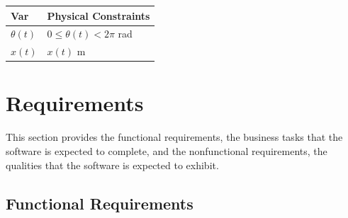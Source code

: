 \documentclass[12pt]{article}
\newcommand{\aref}[1]{A\ref{#1}}
\begin{document}
\begin{table}[!h]
\caption{Output Variables} \label{TblOutputVar}
\renewcommand{\arraystretch}{1.2}
\noindent \begin{longtable*}{l l} 
  \toprule
  \textbf{Var} & \textbf{Physical Constraints} \\
  \midrule 
  $\theta(t)$ &  $0\leq \theta(t) < 2\pi$   \si{\radian}\\
  $x(t)$      &  $ x(t)$ \si{\metre}
  \\
  \bottomrule
\end{longtable*}
\end{table}


\section{Requirements} \label{sec:reqs}


This section provides the functional requirements, the business tasks that the
software is expected to complete, and the nonfunctional requirements, the
qualities that the software is expected to exhibit.

\subsection{Functional Requirements}
\end{document}
